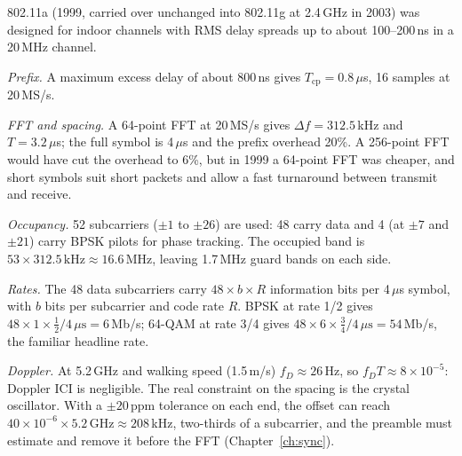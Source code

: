 \begin{worked}
802.11a (1999, carried over unchanged into 802.11g at 2.4\,GHz in 2003) was designed for indoor channels
with RMS delay spreads up to about 100--200\,ns in a 20\,MHz channel.

\emph{Prefix.} A maximum excess delay of about 800\,ns gives $T_{\text{cp}}=0.8\,\mu$s, 16 samples at
20\,MS/s.

\emph{FFT and spacing.} A 64-point FFT at 20\,MS/s gives $\Delta f=312.5$\,kHz and $T=3.2\,\mu$s; the full
symbol is 4\,$\mu$s and the prefix overhead 20\%. A 256-point FFT would have cut the overhead to 6\%, but in
1999 a 64-point FFT was cheaper, and short symbols suit short packets and allow a fast turnaround between
transmit and receive.

\emph{Occupancy.} 52 subcarriers ($\pm1$ to $\pm26$) are used: 48 carry data and 4 (at $\pm7$ and $\pm21$) carry
BPSK pilots for phase tracking. The occupied band is $53\times312.5\,\text{kHz}\approx16.6$\,MHz, leaving 1.7\,MHz
guard bands on each side.

\emph{Rates.} The 48 data subcarriers carry $48\times b\times R$ information bits per 4\,$\mu$s symbol, with $b$
bits per subcarrier and code rate $R$. BPSK at rate 1/2 gives $48\times1\times\tfrac12/4\,\mu\text{s}=6$\,Mb/s;
64-QAM at rate 3/4 gives $48\times6\times\tfrac34/4\,\mu\text{s}=54$\,Mb/s, the familiar headline rate.

\emph{Doppler.} At 5.2\,GHz and walking speed (1.5\,m/s) $f_D\approx26$\,Hz, so $f_DT\approx8\times10^{-5}$: Doppler
ICI is negligible. The real constraint on the spacing is the crystal oscillator. With a $\pm20$\,ppm
tolerance on each end, the offset can reach $40\times10^{-6}\times5.2\,\text{GHz}\approx208$\,kHz, two-thirds of a
subcarrier, and the preamble must estimate and remove it before the FFT (Chapter~\ref{ch:sync}).
\end{worked}

